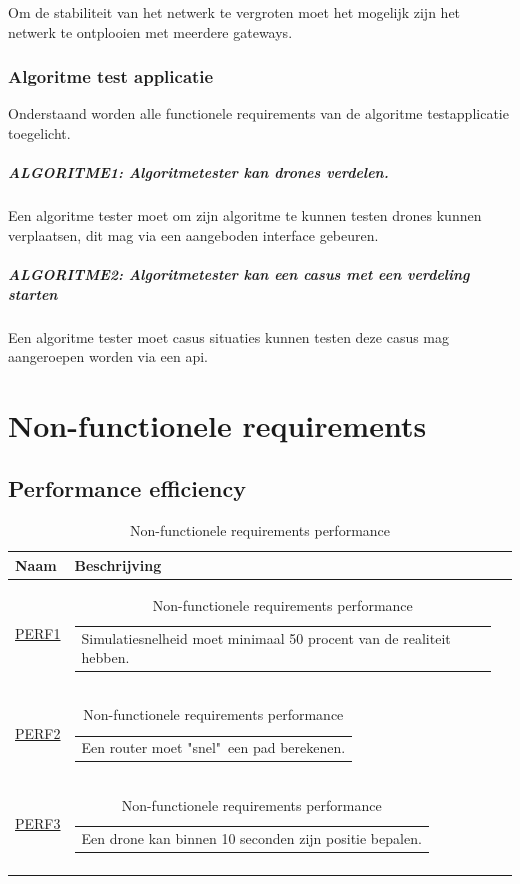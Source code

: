 \documentclass[a4paper, 11pt, oneside]{report}
\begin{document}
Om de stabiliteit van het netwerk te vergroten moet het mogelijk zijn het netwerk te ontplooien met meerdere gateways. 


\subsection{Algoritme test applicatie}
Onderstaand worden alle functionele requirements van de algoritme testapplicatie toegelicht.
\paragraph{ALGORITME1: Algoritmetester kan drones verdelen.}
\hypertarget{ALGORITME1}{}
Een algoritme tester moet om zijn algoritme te kunnen testen drones kunnen verplaatsen, dit mag via een aangeboden interface gebeuren.
\paragraph{ALGORITME2: Algoritmetester kan een casus met een verdeling starten}
\hypertarget{ALGORITME2}{}
Een algoritme tester moet casus situaties kunnen testen deze casus mag aangeroepen worden via een api. 

\chapter{Non-functionele requirements}
\section{Performance efficiency}

\begin{longtable}{|l|l|l|}
	\hline
	\rowcolor[HTML]{C0C0C0} 
	Naam & Beschrijving \\ \hline
	\endhead
	\hyperlink{PERF1}{PERF1}			&\begin{tabular}[c]{@{}l@{}}Simulatiesnelheid moet minimaal 50 procent van de realiteit hebben.	\end{tabular}\\ \hline
	\hyperlink{PERF2}{PERF2}			&\begin{tabular}[c]{@{}l@{}}Een router moet "snel"\ een pad berekenen.\end{tabular}\\ \hline
	\hyperlink{PERF3}{PERF3}			&\begin{tabular}[c]{@{}l@{}}Een drone kan binnen 10 seconden zijn positie bepalen.\end{tabular}\\ \hline
	\caption{Non-functionele requirements performance}
	\label{tab:nietfunctionelecriteria:performance}
\end{longtable}
\end{document}
